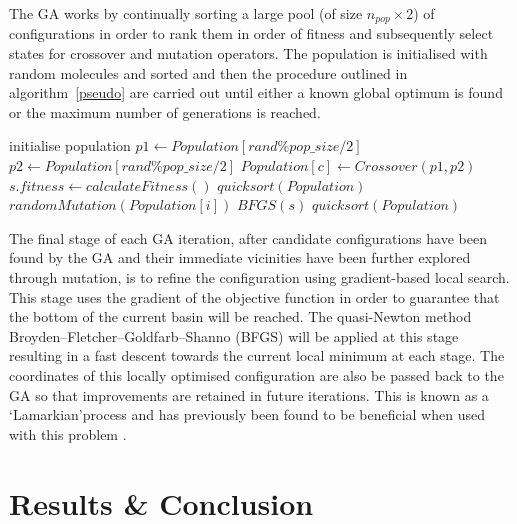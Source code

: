 \documentclass{article}
\begin{document}
The GA works by continually sorting a large pool (of size $n_{pop} \times 2$) of
configurations in order to rank them in order of fitness and subsequently select
states for crossover and mutation operators. The population is initialised with
random molecules and sorted and then the procedure outlined in
algorithm~\ref{pseudo} are carried out until either a known global optimum is
found or the maximum number of generations is reached.

\begin{algorithm}[H] \label{pseudo}
	initialise population\;
	 {
		 {
			$p1\leftarrow Population[rand \% pop\_size / 2]$\;
			$p2\leftarrow Population[rand \% pop\_size / 2]$\;
			$Population[c] \leftarrow Crossover(p1, p2)$\;
		}
		 {
			$s.fitness \leftarrow calculateFitness()$\;
		}
		$quicksort(Population)$\;
		 {
			 {
				$randomMutation(Population[i])$\;
			}
		}
		 {
			$BFGS(s)$\;
		}
		$quicksort(Population)$
	}
\end{algorithm}
The final stage of each GA iteration, after candidate configurations have been
found by the GA and their immediate vicinities have been further explored
through mutation, is to refine the configuration using gradient-based local
search. This stage uses the gradient of the objective function in order to
guarantee that the bottom of the current basin will be reached. The quasi-Newton
method Broyden–Fletcher–Goldfarb–Shanno (BFGS) will be applied at this stage
resulting in a fast descent towards the current local minimum at each stage. The
coordinates of this locally optimised configuration are also be passed back to
the GA so that improvements are retained in future iterations. This is known as
a `Lamarkian'process and has previously been found to be beneficial when used
with this problem \cite{doi:10.1002/qua.560440214}.

\section{Results \& Conclusion}
\end{document}
